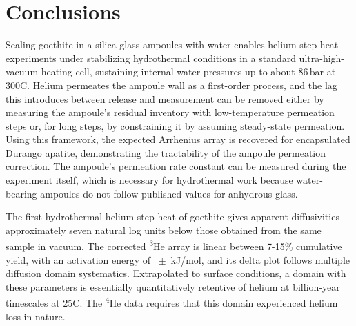 
\section{Conclusions}\label{sec:conclusions}

Sealing goethite in a silica glass ampoules with water enables helium step heat experiments under stabilizing hydrothermal conditions in a standard ultra-high-vacuum heating cell, sustaining internal water pressures up to about 86\,bar at 300\textdegree C. Helium permeates the ampoule wall as a first-order process, and the lag this introduces between release and measurement can be removed either by measuring the ampoule's residual inventory with low-temperature permeation steps or, for long steps, by constraining it by assuming steady-state permeation. Using this framework, the expected Arrhenius array is recovered for encapsulated Durango apatite, demonstrating the tractability of the ampoule permeation correction. The ampoule's permeation rate constant can be measured during the experiment itself, which is necessary for hydrothermal work because water-bearing ampoules do not follow published values for anhydrous glass.

The first hydrothermal helium step heat of goethite gives apparent diffusivities approximately seven natural log units below those obtained from the same sample in vacuum. The corrected \textsuperscript{3}He array is linear between 7-15\% cumulative yield, with an activation energy of \ChTwoEa\ $\pm$ \ChTwoEaErr\,kJ/mol, and its delta plot follows multiple diffusion domain systematics. Extrapolated to surface conditions, a domain with these parameters is essentially quantitatively retentive of helium at billion-year timescales at 25\textdegree C. The \textsuperscript{4}He data requires that this domain experienced helium loss in nature. 

